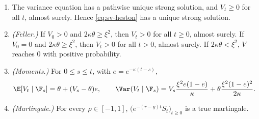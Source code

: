 \begin{proposition}\label{prop:sv-wellposed}
\begin{enumerate}[label=(\roman*)]
  \item The variance equation has a pathwise unique strong solution, and $V_t\ge0$ for all $t$, almost
    surely. Hence \eqref{eq:sv-heston} has a unique strong solution.
  \item \emph{(Feller.)} If $V_0>0$ and $2\kappa\theta\ge\xi^2$, then $V_t>0$ for all $t\ge0$, almost surely.
    If $V_0=0$ and $2\kappa\theta\ge\xi^2$, then $V_t>0$ for all $t>0$, almost surely. If $2\kappa\theta<\xi^2$,
    $V$ reaches $0$ with positive probability.
  \item \emph{(Moments.)} For $0\le s\le t$, with $e=e^{-\kappa(t-s)}$,
    \begin{equation}\label{eq:sv-cir-moments}
      \E[V_t\mid\F_s]=\theta+(V_s-\theta)e,\qquad
      \Var(V_t\mid\F_s)=V_s\frac{\xi^2e(1-e)}{\kappa}+\theta\frac{\xi^2(1-e)^2}{2\kappa}.
    \end{equation}
  \item \emph{(Martingale.)} For every $\rho\in[-1,1]$, $\big(e^{-(r-y)t}S_t\big)_{t\ge0}$ is a true martingale.
\end{enumerate}
\end{proposition}

